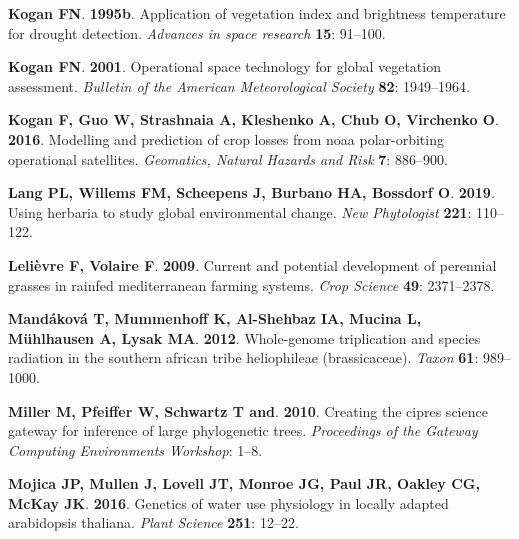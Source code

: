 \documentclass[man,floatsintext]{apa6}
\theoremstyle{definition}
\theoremstyle{definition}
\theoremstyle{definition}
\theoremstyle{remark}
\begin{document}
\leavevmode\hypertarget{ref-kogan1995application}{}%
\textbf{\textnormal{Kogan FN}}. \textbf{1995b}. Application of
vegetation index and brightness temperature for drought detection.
\emph{Advances in space research} \textbf{15}: 91--100.

\leavevmode\hypertarget{ref-kogan2001operational}{}%
\textbf{\textnormal{Kogan FN}}. \textbf{2001}. Operational space
technology for global vegetation assessment. \emph{Bulletin of the
American Meteorological Society} \textbf{82}: 1949--1964.

\leavevmode\hypertarget{ref-kogan2016modelling}{}%
\textbf{\textnormal{Kogan F}, \textnormal{Guo W}, \textnormal{Strashnaia
A}, \textnormal{Kleshenko A}, \textnormal{Chub O}, \textnormal{Virchenko
O}}. \textbf{2016}. Modelling and prediction of crop losses from noaa
polar-orbiting operational satellites. \emph{Geomatics, Natural Hazards
and Risk} \textbf{7}: 886--900.

\leavevmode\hypertarget{ref-lang2019using}{}%
\textbf{\textnormal{Lang PL}, \textnormal{Willems FM},
\textnormal{Scheepens J}, \textnormal{Burbano HA}, \textnormal{Bossdorf
O}}. \textbf{2019}. Using herbaria to study global environmental change.
\emph{New Phytologist} \textbf{221}: 110--122.

\leavevmode\hypertarget{ref-lelievre2009current}{}%
\textbf{\textnormal{Lelièvre F}, \textnormal{Volaire F}}. \textbf{2009}.
Current and potential development of perennial grasses in rainfed
mediterranean farming systems. \emph{Crop Science} \textbf{49}:
2371--2378.

\leavevmode\hypertarget{ref-mandakova2012whole}{}%
\textbf{\textnormal{Mandáková T}, \textnormal{Mummenhoff K},
\textnormal{Al-Shehbaz IA}, \textnormal{Mucina L},
\textnormal{Mühlhausen A}, \textnormal{Lysak MA}}. \textbf{2012}.
Whole-genome triplication and species radiation in the southern african
tribe heliophileae (brassicaceae). \emph{Taxon} \textbf{61}: 989--1000.

\leavevmode\hypertarget{ref-miller2010creating}{}%
\textbf{\textnormal{Miller M}, \textnormal{Pfeiffer W},
\textnormal{Schwartz T and}}. \textbf{2010}. Creating the cipres science
gateway for inference of large phylogenetic trees. \emph{Proceedings of
the Gateway Computing Environments Workshop}: 1--8.

\leavevmode\hypertarget{ref-mojica2016genetics}{}%
\textbf{\textnormal{Mojica JP}, \textnormal{Mullen J},
\textnormal{Lovell JT}, \textnormal{Monroe JG}, \textnormal{Paul JR},
\textnormal{Oakley CG}, \textnormal{McKay JK}}. \textbf{2016}. Genetics
of water use physiology in locally adapted arabidopsis thaliana.
\emph{Plant Science} \textbf{251}: 12--22.
\end{document}
